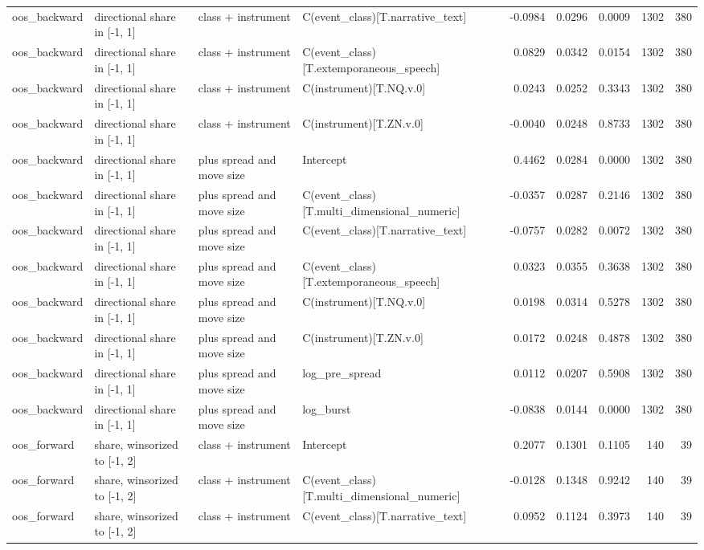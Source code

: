 \begin{tabular}{llllrrrrr}
oos_backward & directional share in [-1, 1] & class + instrument & C(event_class)[T.narrative_text] & -0.0984 & 0.0296 & 0.0009 & 1302 & 380 \\
oos_backward & directional share in [-1, 1] & class + instrument & C(event_class)[T.extemporaneous_speech] & 0.0829 & 0.0342 & 0.0154 & 1302 & 380 \\
oos_backward & directional share in [-1, 1] & class + instrument & C(instrument)[T.NQ.v.0] & 0.0243 & 0.0252 & 0.3343 & 1302 & 380 \\
oos_backward & directional share in [-1, 1] & class + instrument & C(instrument)[T.ZN.v.0] & -0.0040 & 0.0248 & 0.8733 & 1302 & 380 \\
oos_backward & directional share in [-1, 1] & plus spread and move size & Intercept & 0.4462 & 0.0284 & 0.0000 & 1302 & 380 \\
oos_backward & directional share in [-1, 1] & plus spread and move size & C(event_class)[T.multi_dimensional_numeric] & -0.0357 & 0.0287 & 0.2146 & 1302 & 380 \\
oos_backward & directional share in [-1, 1] & plus spread and move size & C(event_class)[T.narrative_text] & -0.0757 & 0.0282 & 0.0072 & 1302 & 380 \\
oos_backward & directional share in [-1, 1] & plus spread and move size & C(event_class)[T.extemporaneous_speech] & 0.0323 & 0.0355 & 0.3638 & 1302 & 380 \\
oos_backward & directional share in [-1, 1] & plus spread and move size & C(instrument)[T.NQ.v.0] & 0.0198 & 0.0314 & 0.5278 & 1302 & 380 \\
oos_backward & directional share in [-1, 1] & plus spread and move size & C(instrument)[T.ZN.v.0] & 0.0172 & 0.0248 & 0.4878 & 1302 & 380 \\
oos_backward & directional share in [-1, 1] & plus spread and move size & log_pre_spread & 0.0112 & 0.0207 & 0.5908 & 1302 & 380 \\
oos_backward & directional share in [-1, 1] & plus spread and move size & log_burst & -0.0838 & 0.0144 & 0.0000 & 1302 & 380 \\
oos_forward & share, winsorized to [-1, 2] & class + instrument & Intercept & 0.2077 & 0.1301 & 0.1105 & 140 & 39 \\
oos_forward & share, winsorized to [-1, 2] & class + instrument & C(event_class)[T.multi_dimensional_numeric] & -0.0128 & 0.1348 & 0.9242 & 140 & 39 \\
oos_forward & share, winsorized to [-1, 2] & class + instrument & C(event_class)[T.narrative_text] & 0.0952 & 0.1124 & 0.3973 & 140 & 39 \\

\end{tabular}
